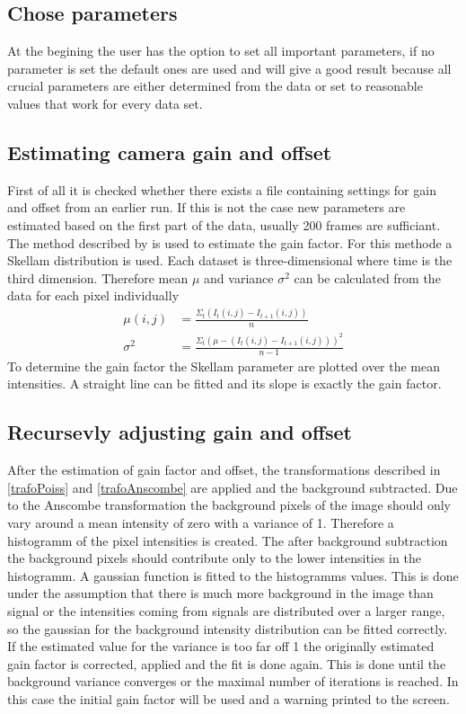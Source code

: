 \subsection{Chose parameters}
At the begining the user has the option to set all important parameters, if no parameter is set the default ones are used and will give a good result because all crucial parameters are either determined from the data or set to reasonable values that work for every data set.
\subsection{Estimating camera gain and offset}
First of all it is checked whether there exists a file containing settings for gain and offset from an earlier run. If this is not the case new parameters are estimated based on the first part of the data, usually 200 frames are sufficiant.
The method described by \cite{skellam} is used to estimate the
gain factor. For this methode a Skellam distribution is used. 
Each dataset is three-dimensional where time is the third
dimension. Therefore mean $\mu$ and variance $\sigma^2$ can be calculated from
the data for each pixel individually
\begin{align}
	\mu(i,j) & = \frac{\Sigma_t(I_t(i,j)-I_{t+1}(i,j))}{n}\\
	\sigma^2 & = \frac{\Sigma_t(\mu-(I_t(i,j)-I_{t+1}(i,j)))^2}{n-1}
\end{align} 
To determine the gain factor the Skellam parameter are plotted over the mean
intensities. A straight line can be fitted and its slope is exactly the gain
factor.
\subsection{Recursevly adjusting gain and offset}
After the estimation of gain factor and offset, the transformations described in \ref{trafoPoiss} and \ref{trafoAnscombe} are applied and the background subtracted.\newline
Due to the Anscombe transformation the background pixels of the image should only vary around a mean intensity of zero with a variance of 1. Therefore a histogramm of the pixel intensities is created. The after background subtraction the background pixels should contribute only to the lower intensities in the histogramm. A gaussian function is fitted to the histogramms values. This is done under the assumption that there is much more background in the image than signal or the intensities coming from signals are distributed over a larger range, so the gaussian for the background intensity distribution can be fitted correctly.\newline
If the estimated value for the variance is too far off 1 the originally estimated gain factor is corrected, applied and the fit is done again. This is done until the background variance converges or the maximal number of iterations is reached. In this case the initial gain factor will be used and a warning printed to the screen.
